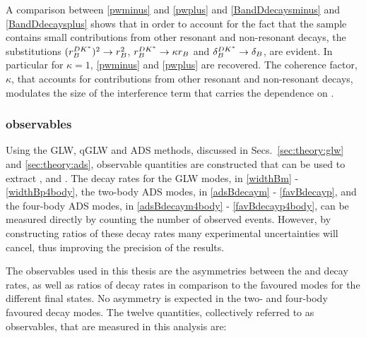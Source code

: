 A comparison between \eqns\ref{pwminus} and \ref{pwplus} and \eqns\ref{BandDdecaysminus} and \ref{BandDdecaysplus} shows that in order to account for the fact that the \decay{\Bm}{\D\Kstarm} sample contains small contributions from other resonant and non-resonant \decay{\Bm}{\D\KS\pim} decays, the substitutions $(r_B^{DK^*})^2 \rightarrow r_B^2$, $r_B^{DK^*} \rightarrow \kappa r_B$ and $\delta_B^{DK^*} \rightarrow \delta_B$, are evident. In particular for $\kappa = 1$, \eqns\ref{pwminus} and \ref{pwplus} are recovered. The coherence factor, $\kappa$, that accounts for contributions from other resonant and non-resonant \decay{\Bm}{\D\KS\pim} decays, modulates the size of the interference term that carries the dependence on \Pgamma.

\subsubsection{\CP observables}
\label{sec:theory:observables}

Using the GLW, qGLW and ADS methods, discussed in Secs.~\ref{sec:theory:glw} and \ref{sec:theory:ads}, observable quantities are constructed that can be used to extract \rb, \deltab and \Pgamma. The decay rates for the GLW modes, in \eqns\ref{widthBm} - \ref{widthBp4body}, the two-body ADS modes, in \eqns\ref{adsBdecaym} - \ref{favBdecayp}, and the four-body ADS modes, in \eqns\ref{adsBdecaym4body} - \ref{favBdecayp4body}, can be measured directly by counting the number of observed events. However, by constructing ratios of these decay rates many experimental uncertainties will cancel, thus improving the precision of the results. 

The observables used in this thesis are the asymmetries between the \Bm and \Bp decay rates, as well as ratios of decay rates in comparison to the favoured modes for the different \Dz final states. No \CP asymmetry is expected in the two- and four-body favoured \Dz decay modes. The twelve quantities, collectively referred to as \CP observables, that are measured in this analysis are:

